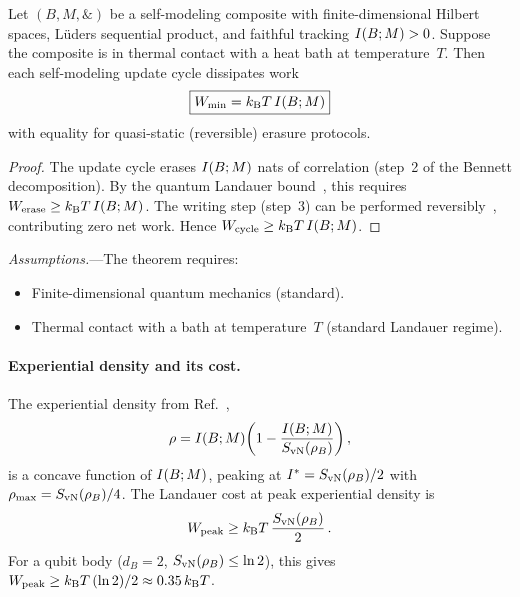 \begin{theorem}
\label{thm:landauer}
Let $(B,M,\mathbin{\&})$ be a self-modeling composite with
finite-dimensional Hilbert spaces, Lüders sequential product, and
faithful tracking $I(B;M) > 0$.  Suppose the composite is in
thermal contact with a heat bath at temperature~$T$.  Then each
self-modeling update cycle dissipates work
\begin{equation}
  \boxed{W_{\min} = k_{\mathrm{B}} T\,I(B;M)}
  \label{eq:landauer}
\end{equation}
with equality for quasi-static (reversible) erasure protocols.
\end{theorem}

\begin{proof}
The update cycle erases $I(B;M)$ nats of correlation
(step~2 of the Bennett decomposition).  By the quantum Landauer
bound~\cite{ReebWolf2014}, this requires
$W_{\mathrm{erase}} \geq k_{\mathrm{B}} T\,I(B;M)$.  The writing step
(step~3) can be performed reversibly~\cite{Bennett1982}, contributing
zero net work.  Hence $W_{\mathrm{cycle}} \geq k_{\mathrm{B}} T\,I(B;M)$.
\end{proof}

\noindent\textit{Assumptions.}---The theorem requires:
\begin{itemize}
  \item[\textbf{A1.}] Finite-dimensional quantum mechanics (standard).
  \item[\textbf{A2.}] Thermal contact with a bath at temperature~$T$
    (standard Landauer regime).
\end{itemize}

\paragraph{Experiential density and its cost.}
The experiential density from Ref.~\cite{Paper5},
\begin{equation}
  \rho = I(B;M)\!\left(1 - \frac{I(B;M)}{S_{\mathrm{vN}}(\rho_B)}\right),
  \label{eq:rho-def}
\end{equation}
is a concave function of $I(B;M)$, peaking at
$I^{*} = S_{\mathrm{vN}}(\rho_B)/2$ with $\rho_{\max} = S_{\mathrm{vN}}(\rho_B)/4$.
The Landauer cost at peak experiential density is
\begin{equation}
  W_{\mathrm{peak}} \geq k_{\mathrm{B}} T\,\frac{S_{\mathrm{vN}}(\rho_B)}{2} \,.
  \label{eq:peak-cost}
\end{equation}
For a qubit body ($d_B = 2$, $S_{\mathrm{vN}}(\rho_B) \leq \ln 2$), this gives
$W_{\mathrm{peak}} \geq k_{\mathrm{B}} T\,(\ln 2)/2 \approx 0.35\,k_{\mathrm{B}} T$.

